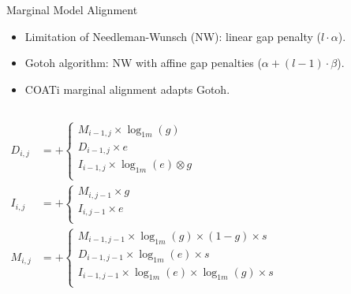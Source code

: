 \documentclass[aspectratio=169,font=14pt]{beamer}
\begin{document}
\begin{frame}{Marginal Model Alignment} %
\begin{itemize}
    \item Limitation of Needleman-Wunsch (NW): linear gap penalty ($l \cdot \alpha$).
    \item Gotoh algorithm: NW with affine gap penalties ($\alpha + (l - 1) \cdot \beta$).
    \item COATi marginal alignment adapts Gotoh.
\end{itemize}
\begin{columns}
\begin{align*}
    D_{i,j} &= + \begin{cases}
        M_{i-1, j} \times \log_{1m}(g)\\
        D_{i-1, j} \times e\\
        I_{i-1, j} \times \log_{1m}(e) \otimes g\\
    \end{cases}\\
    I_{i,j} &= + \begin{cases}
        M_{i ,j-1} \times g\\
        I_{i, j-1} \times e\\
    \end{cases}\\
    M_{i,j} &= + \begin{cases}
        M_{i-1, j-1} \times \log_{1m}(g) \times (1-g) \times s\\
        D_{i-1, j-1} \times \log_{1m}(e) \times s\\
        I_{i-1, j-1} \times \log_{1m}(e) \times \log_{1m}(g) \times s\\
    \end{cases}\\
\end{align*}
    \centering
    \resizebox{\textwidth}{!}{}
\end{columns}
\end{frame} %
\end{document}
